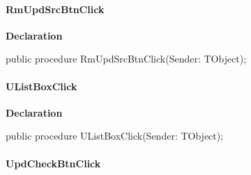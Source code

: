\documentclass{report}
\newif\ifpdf
\begin{document}
\paragraph*{RmUpdSrcBtnClick}\hspace*{\fill}

\label{manager.TMnFrm-RmUpdSrcBtnClick}
\begin{list}{}{
\setlength{\itemindent}{0cm}
\setlength{\listparindent}{0cm}
\setlength{\leftmargin}{\evensidemargin}
\addtolength{\leftmargin}{\tmplength}
\settowidth{\labelsep}{X}
\addtolength{\leftmargin}{\labelsep}
\setlength{\labelwidth}{\tmplength}
}
\item[\textbf{Declaration}\hfill]
\ifpdf
\begin{flushleft}
\fi
\begin{ttfamily}
public procedure RmUpdSrcBtnClick(Sender: TObject);\end{ttfamily}

\ifpdf
\end{flushleft}
\fi

\end{list}
\paragraph*{UListBoxClick}\hspace*{\fill}

\label{manager.TMnFrm-UListBoxClick}
\begin{list}{}{
\setlength{\itemindent}{0cm}
\setlength{\listparindent}{0cm}
\setlength{\leftmargin}{\evensidemargin}
\addtolength{\leftmargin}{\tmplength}
\settowidth{\labelsep}{X}
\addtolength{\leftmargin}{\labelsep}
\setlength{\labelwidth}{\tmplength}
}
\item[\textbf{Declaration}\hfill]
\ifpdf
\begin{flushleft}
\fi
\begin{ttfamily}
public procedure UListBoxClick(Sender: TObject);\end{ttfamily}

\ifpdf
\end{flushleft}
\fi

\end{list}
\paragraph*{UpdCheckBtnClick}\hspace*{\fill}
\end{document}
